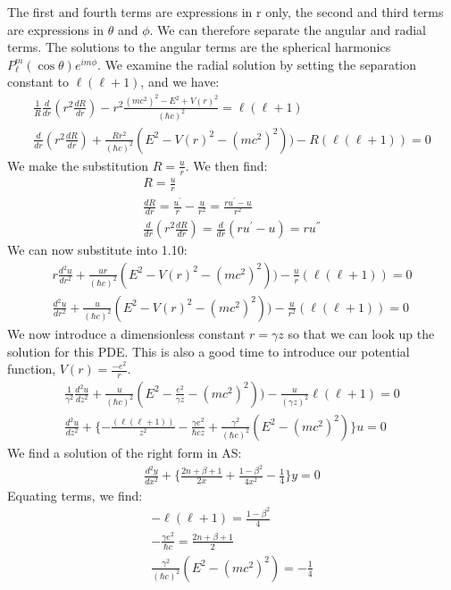 \documentclass[a4paper,10pt]{article}
\numberwithin{equation}{section}
\begin{document}
The first and fourth terms are expressions in r only, the second and third terms are expressions in $\theta$ and $\phi$.
We can therefore separate the angular and radial terms.
The solutions to the angular terms are the spherical harmonics $P_{\ell}^{m}(\cos \theta)e^{im\phi}$.
We examine the radial solution by setting the separation constant to $\ell(\ell+1)$, and we have:
\begin{gather}
  \frac{1}{R}\frac{d}{dr}(r^2\frac{dR}{dr})-r^2\frac{(mc^2)^2-E^2+V(r)^2}{(\hbar c)^2}=\ell(\ell+1)\\
  \frac{d}{dr}(r^2\frac{dR}{dr})+\frac{Rr^2}{(\hbar c)^2}(E^2-V(r)^2-(mc^2)^2))-R(\ell(\ell+1))=0
\end{gather}
We make the substitution $R=\frac{u}{r}$. We then find:
\begin{gather}
R = \frac{u}{r}\\
\frac{dR}{dr}=\frac{u^{'}}{r}-\frac{u}{r^2}= \frac{ru^{'}-u}{r^2}\\
\frac{d}{dr}(r^2\frac{dR}{dr})=\frac{d}{dr}(ru^{'}-u)=ru^{''}
\end{gather}
We can now substitute into 1.10:
\begin{gather}
 r\frac{d^2u}{dr^2}+\frac{ur}{(\hbar c)^2}(E^2-V(r)^2-(mc^2)^2))-\frac{u}{r}(\ell(\ell+1))=0\\
 \frac{d^2u}{dr^2}+\frac{u}{(\hbar c)^2}(E^2-V(r)^2-(mc^2)^2))-\frac{u}{r^2}(\ell(\ell+1))=0
\end{gather}
We now introduce a dimensionless constant $r=\gamma z$ so that we can look up the solution for this PDE.
This is also a good time to introduce our potential function, $V(r) = \frac{-e^2}{r}$.
\begin{gather}
 \frac{1}{\gamma ^2}\frac{d^2u}{dz^2}+\frac{u}{(\hbar c)^2}(E^2-\frac{e^2}{\gamma z}-(mc^2)^2))-\frac{u}{(\gamma z)^2}\ell(\ell+1)=0\\
 \frac{d^2u}{dz^2}+\{-\frac{(\ell(\ell+1))}{z^2}-\frac{\gamma e^2}{\hbar c z}+\frac{ \gamma^2}{(\hbar c)^2}(E^2-(mc^2)^2) \}u=0
\end{gather}
We find a solution of the right form in AS:
\begin{gather}
 \frac{d^2y}{dx^2}+\{\frac{2n+\beta +1}{2x}+\frac{1-\beta ^2}{4x^2}-\frac{1}{4} \}y=0
\end{gather}
Equating terms, we find:
\begin{gather}
 -\ell(\ell+1)=\frac{1-\beta ^2}{4}\\
 -\frac{\gamma e^2}{\hbar c}=\frac{2n+\beta +1}{2}\\
 \frac{\gamma^2}{(\hbar c)^2}(E^2-(mc^2)^2)=-\frac{1}{4}
\end{gather}
\end{document}
